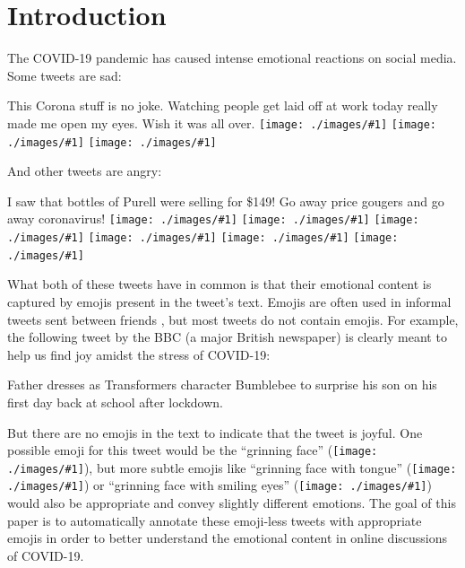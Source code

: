 \documentclass[11pt]{article}
\newcommand{\XXX}{{\color{red}\textbf{XXX}}~}
\newcommand{\emoji}[1]{\texttt{[image: ./images/\#1]}}
\DeclareMathOperator{\corona}{\texttt{TwitterCOVID}}
\begin{document}
\section{Introduction}
\label{sec:intro}

The COVID-19 pandemic has caused intense emotional reactions on social media.
Some tweets are sad:
\begin{displayquote}
    This Corona stuff is no joke. Watching people get laid off at work today really made me open my eyes. Wish it was all over. 
    \emoji{loudly-crying-face_1f62d} 
    \emoji{anguished-face_1f627}
    \emoji{folded-hands_1f64f}
\end{displayquote}
And other tweets are angry:
\begin{displayquote}
    I saw that bottles of Purell were selling for \$149! Go away price gougers and go away coronavirus! 
    \emoji{angry-face_1f620}
    \emoji{angry-face_1f620}
    \emoji{angry-face_1f620}
    \emoji{angry-face_1f620}
    \emoji{angry-face_1f620}
    \emoji{angry-face_1f620}
\end{displayquote}
What both of these tweets have in common is that their emotional content is captured by emojis present in the tweet's text.
Emojis are often used in informal tweets sent between friends \citep{marcel2016emoji},
but most tweets do not contain emojis.
For example, the following tweet by the BBC (a major British newspaper) is clearly meant to help us find joy amidst the stress of COVID-19:
\begin{displayquote}
    Father dresses as Transformers character Bumblebee to surprise his son on his first day back at school after lockdown.
\end{displayquote}
But there are no emojis in the text to indicate that the tweet is joyful.
One possible emoji for this tweet would be the ``grinning face'' (\emoji{grinning-face_1f600}),
but more subtle emojis like ``grinning face with tongue'' (\emoji{face-with-tongue_1f61b}) or ``grinning face with smiling eyes'' (\emoji{grinning-face-with-smiling-eyes_1f604}) would also be appropriate and convey slightly different emotions.
The goal of this paper is to automatically annotate these emoji-less tweets with appropriate emojis in order to better understand the emotional content in online discussions of COVID-19.
\end{document}
